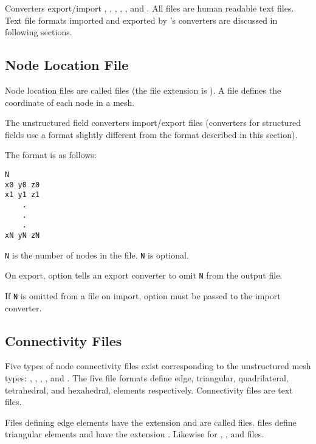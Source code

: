 Converters export/import , , , , ,  and .  All files are human readable text files.  Text file formats
imported and exported by \sr{}'s converters are discussed in following
sections.

\subsection{Node Location File}
\label{sec:node_loc_fmt}

Node location files are called  files (the file extension is
).  A  file defines the coordinate of
each node in a mesh.

The unstructured field converters import/export  files
(converters for structured fields use a  format slightly
different from the format described in this section).

The format is as follows:

\begin{verbatim}
N
x0 y0 z0
x1 y1 z1
    .
    .
    .
xN yN zN
\end{verbatim}

\verb|N| is the number of nodes in the file.  \verb|N| is optional.

On export, option  tells an export converter to
omit \verb|N| from the output file.

If \verb|N| is omitted from a file on import, option
 must be passed to the import converter.


\subsection{Connectivity Files}
\label{sec:node_conn_fmt}

Five types of node connectivity files exist corresponding to the
unstructured mesh types: , ,
, , and
.  The five file formats define
edge, triangular, quadrilateral, tetrahedral, and hexahedral,
elements respectively.  Connectivity files are text files.

Files defining edge elements have the extension  and
are called  files.   files define triangular
elements and have the extension .  Likewise for
, , and  files.

